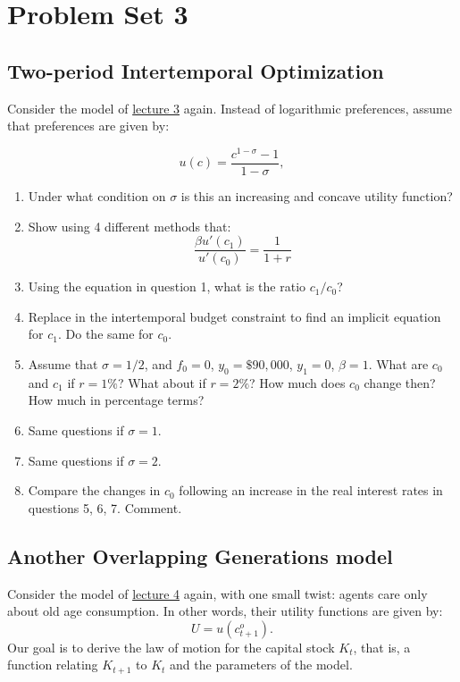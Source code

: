 \documentclass[]{book}
\theoremstyle{definition}
\theoremstyle{definition}
\theoremstyle{definition}
\theoremstyle{remark}
\begin{document}
\hypertarget{pset3}{\chapter{Problem Set 3}\label{pset3}}

\section{Two-period Intertemporal
Optimization}\label{two-period-intertemporal-optimization}

Consider the model of \protect\hyperlink{two-period}{lecture 3} again.
Instead of logarithmic preferences, assume that preferences are given
by:

\[u(c) = \frac{c^{1-\sigma}-1}{1-\sigma},\]

\begin{enumerate}
\def\labelenumi{\arabic{enumi}.}
\item
  Under what condition on \(\sigma\) is this an increasing and concave
  utility function?
\item
  Show using 4 different methods that:
  \[\frac{\beta u'(c_{1})}{u'(c_{0})}=\frac{1}{1+r}\]
\item
  Using the equation in question 1, what is the ratio \(c_1/c_0\)?
\item
  Replace in the intertemporal budget constraint to find an implicit
  equation for \(c_1\). Do the same for \(c_0\).
\item
  Assume that \(\sigma = 1/2\), and \(f_0=0\), \(y_0=\$90,000\),
  \(y_1=0\), \(\beta = 1\). What are \(c_0\) and \(c_1\) if \(r=1\%\)?
  What about if \(r=2\%\)? How much does \(c_0\) change then? How much
  in percentage terms?
\item
  Same questions if \(\sigma = 1\).
\item
  Same questions if \(\sigma = 2\).
\item
  Compare the changes in \(c_0\) following an increase in the real
  interest rates in questions 5, 6, 7. Comment.
\end{enumerate}

\section{Another Overlapping Generations
model}\label{another-overlapping-generations-model}

Consider the model of \protect\hyperlink{olg}{lecture 4} again, with one
small twist: agents care only about old age consumption. In other words,
their utility functions are given by: \[U=u(c_{t+1}^{o}).\] Our goal is
to derive the law of motion for the capital stock \(K_t\), that is, a
function relating \(K_{t+1}\) to \(K_t\) and the parameters of the
model.
\end{document}
